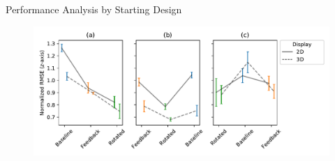 \documentclass[10pt]{beamer}
\begin{document}
\begin{frame}[fragile]{Performance Analysis by Starting Design}
\begin{figure}
  \begin{center}
    \includegraphics[width=\linewidth]{../img/x_design_y_zrmse_col_startdesign_hue_device.pdf}
  \end{center}
\end{figure}
\end{frame}
\end{document}
